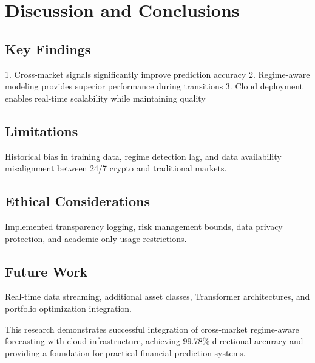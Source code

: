 \documentclass[conference]{IEEEtran}
\begin{document}
\section{Discussion and Conclusions}

\subsection{Key Findings}
1. Cross-market signals significantly improve prediction accuracy
2. Regime-aware modeling provides superior performance during transitions
3. Cloud deployment enables real-time scalability while maintaining quality

\subsection{Limitations}
Historical bias in training data, regime detection lag, and data availability misalignment between 24/7 crypto and traditional markets.

\subsection{Ethical Considerations}
Implemented transparency logging, risk management bounds, data privacy protection, and academic-only usage restrictions.

\subsection{Future Work}
Real-time data streaming, additional asset classes, Transformer architectures, and portfolio optimization integration.

This research demonstrates successful integration of cross-market regime-aware forecasting with cloud infrastructure, achieving 99.78\% directional accuracy and providing a foundation for practical financial prediction systems.
\end{document}
